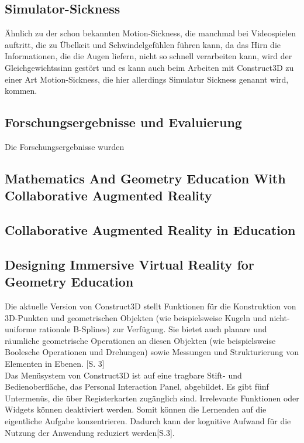 \documentclass[deutsch]{llncs}
\begin{document}
\subsection{Simulator-Sickness}
\label{subsec:}
Ähnlich zu der schon bekannten Motion-Sickness, die manchmal bei Videospielen auftritt, die zu Übelkeit und Schwindelgefühlen führen kann, da das Hirn die Informationen, die die Augen liefern, nicht so schnell verarbeiten kann, wird der Gleichgewichtssinn gestört und es kann auch beim Arbeiten mit Construct3D zu einer Art Motion-Sickness, die hier allerdings Simulatur Sickness genannt wird, kommen.

\subsection{Forschungsergebnisse und Evaluierung}
\label{subsec:}
Die Forschungsergebnisse wurden 

\subsection{Mathematics And Geometry Education With Collaborative Augmented Reality}

\subsection{Collaborative Augmented Reality in Education}

\subsection{Designing Immersive Virtual Reality for Geometry Education}
\label{subsec:}
Die aktuelle Version von Construct3D stellt Funktionen für die Konstruktion von 3D-Punkten und geometrischen Objekten (wie beispielsweise Kugeln und
 nicht-uniforme rationale B-Splines) zur Verfügung. Sie bietet auch planare und räumliche geometrische Operationen an diesen Objekten
 (wie beispielsweise Boolesche Operationen und Drehungen) sowie Messungen und Strukturierung von Elementen in Ebenen. [S. 3]\\
Das Menüsystem von Construct3D ist auf eine tragbare Stift- und Bedienoberfläche, das Personal Interaction Panel, abgebildet. Es gibt fünf 
Untermenüs, die über Registerkarten zugänglich sind. Irrelevante Funktionen oder Widgets können deaktiviert werden. Somit können die 
Lernenden auf die eigentliche Aufgabe konzentrieren. Dadurch kann der kognitive Aufwand für die Nutzung der Anwendung reduziert werden[S.3].
\end{document}
